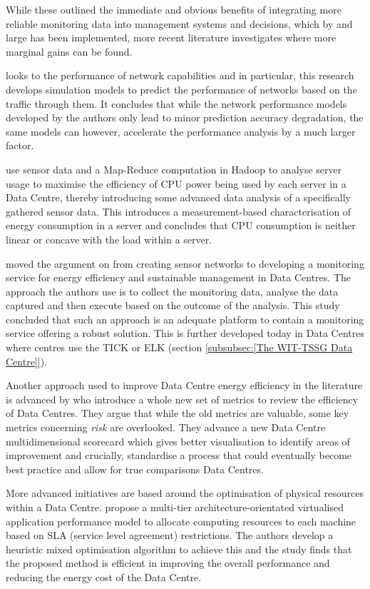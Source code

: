 \documentclass[12pt]{scrartcl}
\begin{document}
While these outlined the immediate and obvious benefits of integrating more reliable monitoring data into management systems and decisions, which by and large has been implemented, more recent literature investigates where more marginal gains can be found.  

\citet{edsdoj.47fdd5c4e23a43e3aa37ddd2fb75d82b20160101} looks to the performance of network capabilities and in particular, this research develops simulation models to predict the performance of networks based on the traffic through them. It concludes that while the  network performance models developed by the authors only lead to minor prediction accuracy degradation, the same models can however, accelerate the performance analysis by a much larger factor. 

\citet{edsarx.1402.080420140101} use sensor data and a Map-Reduce computation in Hadoop to analyse server usage to maximise the efficiency of CPU power being used by each server in a Data Centre, thereby introducing some advanced data analysis of a specifically gathered sensor data. This introduces a measurement-based characterisation of energy consumption in a server and concludes that CPU consumption is neither linear or concave with the load within a server. 

\citet{edsbas.DFD37F4F20160101} moved the argument on from creating sensor networks to developing a monitoring service for energy efficiency and sustainable management in Data Centres. The approach the authors use is to collect the monitoring data, analyse the data captured and then execute based on the outcome of the analysis. This study concluded that such an approach is an adequate platform to contain a monitoring service offering a robust solution. This is further developed today in Data Centres where centres use the TICK or ELK (section \ref{subsubsec:[The WIT-TSSG Data Centre]}).  

Another approach used to improve Data Centre energy efficiency in the literature is advanced by \citet{edsdoj.99f37e7899fb4fcaabdaa81e395626c420180101} who introduce a whole new set of metrics to review the efficiency of Data Centres. They argue that while the old metrics are valuable, some key metrics concerning \emph{risk} are overlooked. They advance a new Data Centre multidimensional scorecard which gives better visualisation to identify areas of improvement and crucially, standardise a process that could eventually become best practice and allow for true comparisons Data Centres. 

More advanced initiatives are based around the optimisation of physical resources within a Data Centre. \citet{10234066620151001} propose a multi-tier architecture-orientated virtualised application performance model to allocate computing resources to each machine based on SLA (service level agreement) restrictions. The authors develop a heuristic mixed optimisation algorithm to achieve this and the study finds that the proposed method is efficient in improving the overall performance and reducing the energy cost of the Data Centre.
\end{document}

